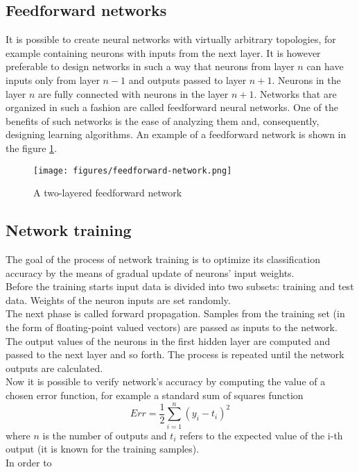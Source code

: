 \documentclass[a4paper, 11pt]{book}
\begin{document}
\subsection{Feedforward networks}
It is possible to create neural networks with virtually arbitrary topologies, for example containing neurons with inputs from the next layer. It is however preferable to design networks in such a way that neurons from layer $n$ can have inputs only from layer $n-1$ and outputs passed to layer $n+1$. Neurons in the layer $n$ are fully connected with neurons in the layer $n+1$. Networks that are organized in such a fashion are called feedforward neural networks. One of the benefits of such networks is the ease of analyzing them and, consequently, designing learning algorithms. 
An example of a feedforward network is shown in the figure \ref{fig:feedforward-network}. 
\begin{figure}[htp]
\centering
\texttt{[image: figures/feedforward-network.png]}
\caption{A two-layered feedforward network}
\label{fig:feedforward-network}
\end{figure}

\subsection{Network training}
The goal of the process of network training is to optimize its classification accuracy by the means of gradual update of neurons' input weights.
\\
Before the training starts input data is divided into two subsets: training and test data.
Weights of the neuron inputs are set randomly.
\\
The next phase is called forward propagation. Samples from the training set (in the form of floating-point valued vectors) are passed as inputs to the network. The output values of the neurons in the first hidden layer are computed and passed to the next layer and so forth. The process is repeated until the network outputs are calculated.
\\
Now it is possible to verify network's accuracy by computing the value of a chosen error function, for example a standard sum of squares function
\begin{equation}
Err = \frac{1}{2}\sum_{i=1}^{n}(y_i - t_i)^2
\end{equation}
where $n$ is the number of outputs and $t_i$ refers to the expected value of the i-th output (it is known for the training samples).
\\
In order to 

{}

\end{document}

